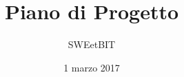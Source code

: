 



\title{\textbf{Piano di Progetto}}
\author{SWEetBIT}

\date{1 marzo 2017}




\makeFrontPage

\tableofcontents





